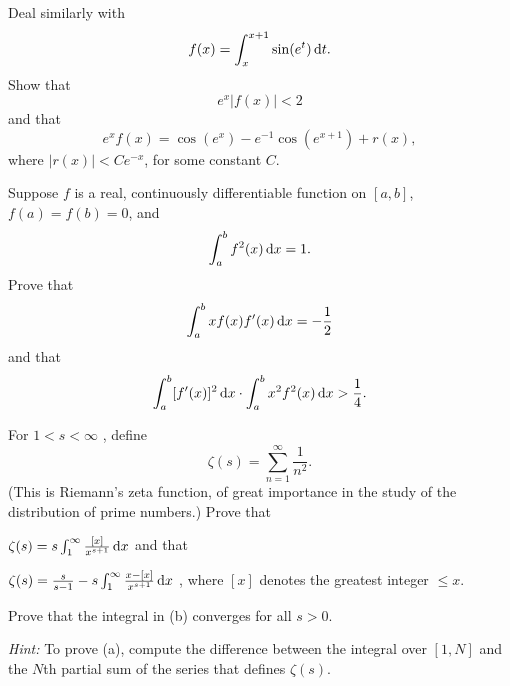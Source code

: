 \begin{myExercise}
    \label{ex:6.14}
    Deal similarly with
    \begin{equation*}
        f(x) = \int_{x}^{x+1} \sin (e^t) \d t . 
    \end{equation*}
    Show that 
    \begin{equation*}
        e^x \left| f(x) \right| < 2
    \end{equation*}
    and that 
    \begin{equation*}
        e^x f(x) = \cos (e^x) - e^{-1} \cos (e^{x+1}) + r(x),
    \end{equation*}
    where $\left| r(x) \right| < C e^{-x}$, for some constant $C$.
\end{myExercise}


\begin{myExercise}
    \label{ex:6.15}
    Suppose $f$ is a real, continuously differentiable function on $[a, b]$,$f(a) =f(b) = 0$, and
    \begin{equation*}
        \int_{a}^{b} f^2 (x) \d x = 1.
    \end{equation*}
    Prove that 
    \begin{equation*}
        \int_{a}^{b} x f(x) f'(x) \d x = -\frac{1}{2}
    \end{equation*}
    and that 
    \begin{equation*}
        \int_{a}^{b}[f'(x)]^2 \d x \cdot 
        \int_{a}^{b}x^2 f^2(x) \d x >
        \frac{1}{4} .
    \end{equation*}
\end{myExercise}


\begin{myExercise}
    \label{ex:6.16}
    For $1<s<\infty$ , define 
    \begin{equation*}
        \zeta(s) = \sum_{n=1}^{\infty} \frac{1}{n^2} .
    \end{equation*}
    (This is Riemann's zeta function, of great importance in the study of the distribution of prime numbers.) 
    Prove that
    \begin{asparaenum}[(a)]
        \item $\zeta(s) = s \int_{1}^{\infty} \frac{[x]}{x^{s+1}}\d x$ 
        and that 
        \item $\zeta(s) = \frac{s}{s-1} - s \int_{1}^{\infty} \frac{x - [x]}{x^{s+1}} \d x$ ,
        where $[x]$ denotes the greatest integer $\leq x$.
    \end{asparaenum}

    Prove that the integral in (b) converges for all $s>0$.

    \emph{Hint:} To prove (a), compute the difference between the integral over $[1,N]$ and the $N$th partial sum of the series that defines $\zeta(s)$.
\end{myExercise}



